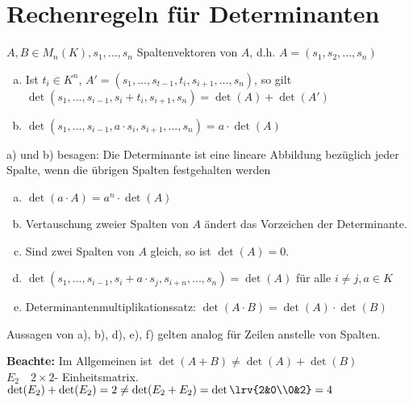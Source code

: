 \section{Rechenregeln für Determinanten}
  $A,B\in M_n(K),s_1,...,s_n$ Spaltenvektoren von $A$, d.h. $A=(s_1,s_2,...,s_n)$
  \begin{enumerate}[a)]
    \item Ist $t_i\in K^n$, $A'=(s_1,...,s_{t-1},t_i,s_{i+1},...,s_n)$, so gilt
      $\det(s_1,...,s_{i-1},s_i+t_i,s_{i+1},s_n)=\det(A)+\det(A')$
    \item $\det(s_1,...,s_{i-1},a\cdot s_i,s_{i+1},...,s_n)=a\cdot\det(A)$
  \end{enumerate}
  a) und b) besagen: Die Determinante ist eine lineare Abbildung bezüglich
  jeder Spalte, wenn die übrigen Spalten festgehalten werden
  \begin{enumerate}[c)]
    \item $\det(a\cdot A)=a^n\cdot\det(A)$
    \item Vertauschung zweier Spalten von $A$ ändert das Vorzeichen der
      Determinante.
    \item Sind zwei Spalten von $A$ gleich, so ist $\det(A)=0$.
    \item $\det(s_1,...,s_{i-1},s_i+a\cdot s_j,s_{i+n},...,s_n)=\det(A)$ für
      alle $i\neq j,a\in K$
    \item Determinantenmultiplikationssatz: $\det(A\cdot
      B)=\det(A)\cdot\det(B)$
  \end{enumerate}

  Aussagen von a), b), d), e), f) gelten analog für Zeilen anstelle von
  Spalten.

  \textbf{Beachte:} Im Allgemeinen ist $\det(A+B)\neq\det(A)+\det(B)$\\

  $E_2\quad 2\times 2$- Einheitsmatrix.\\
  $\det(E_2)+\det(E_2)=2\neq\det(E_2+E_2)=\det\lrv{2&0\\0&2}=4$


